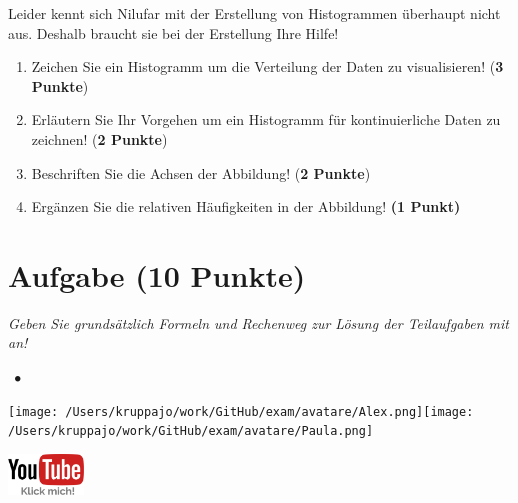 \documentclass[a4paper, 9pt]{scrartcl}\usepackage[]{graphicx}\usepackage[]{xcolor}
\begin{document}
Leider kennt sich Nilufar mit der Erstellung von Histogrammen überhaupt nicht aus. Deshalb braucht sie bei der Erstellung Ihre Hilfe!

\begin{enumerate}
\item Zeichen Sie ein Histogramm um die Verteilung der Daten zu visualisieren! (\textbf{3 Punkte})
 \item Erläutern Sie Ihr Vorgehen um ein Histogramm für kontinuierliche Daten zu zeichnen!  (\textbf{2 Punkte})
\item Beschriften Sie die Achsen der Abbildung! (\textbf{2 Punkte})
\item Ergänzen Sie die relativen Häufigkeiten in der Abbildung! \textbf{(1 Punkt)}  
\end{enumerate}

 
\clearpage

\section{Aufgabe \hfill (10 Punkte)}

\textit{Geben Sie grundsätzlich Formeln und Rechenweg zur Lösung der Teilaufgaben mit an!} \\[1Ex]
 

 
\ifcollection
\begin{flushright}
\tiny\vspace{-3Ex}
\textbf{\examinhaltstart}
\exammodulestatversuch $\;\bullet$
\exammodulebiostat
\vspace{-4Ex}
\end{flushright}
\begin{minipage}[t]{0.5\textwidth}
\texttt{[image: /Users/kruppajo/work/GitHub/exam/avatare/Alex.png]}\hspace{-4mm}\texttt{[image: /Users/kruppajo/work/GitHub/exam/avatare/Paula.png]}
\end{minipage}
\begin{minipage}[t]{0.5\textwidth}
\hfill
\href{https://youtu.be/A4E9zBOltuU}{\includegraphics[width = 2cm]{img/youtube}}
\end{minipage}
\fi
\end{document}
